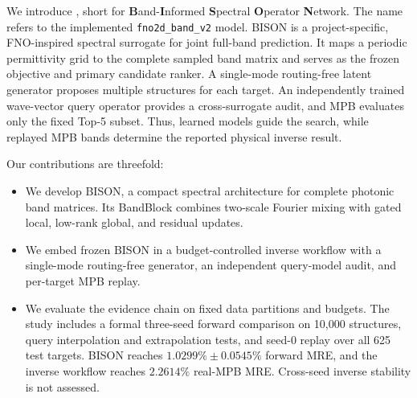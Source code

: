 We introduce \method{}, short for \textbf{B}and-\textbf{I}nformed
\textbf{S}pectral \textbf{O}perator \textbf{N}etwork. The name refers to the
implemented \texttt{fno2d\_\allowbreak band\_\allowbreak v2} model. BISON
is a project-specific, FNO-inspired spectral surrogate for joint full-band
prediction. It maps a periodic permittivity grid to the complete sampled band
matrix and serves as the frozen objective and primary candidate ranker. A
single-mode routing-free latent generator proposes multiple structures for
each target. An independently trained wave-vector query operator provides a
cross-surrogate audit, and MPB evaluates only the fixed Top-5 subset. Thus,
learned models guide the search, while replayed MPB bands determine the reported
physical inverse result.

Our contributions are threefold:
\begin{itemize}
  \item We develop BISON, a compact spectral architecture for complete
  photonic band matrices. Its BandBlock combines two-scale Fourier mixing with
  gated local, low-rank global, and residual updates.
  \item We embed frozen BISON in a budget-controlled inverse workflow with a
  single-mode routing-free generator, an independent query-model audit, and
  per-target MPB replay.
  \item We evaluate the evidence chain on fixed data partitions and budgets.
  The study includes a formal three-seed forward comparison on 10,000
  structures, query interpolation and extrapolation tests, and seed-0 replay
  over all 625 test targets. BISON reaches
  \(1.0299\%\pm0.0545\%\) forward MRE, and the inverse workflow reaches
  \(2.2614\%\) real-MPB MRE. Cross-seed inverse stability is not assessed.
\end{itemize}


